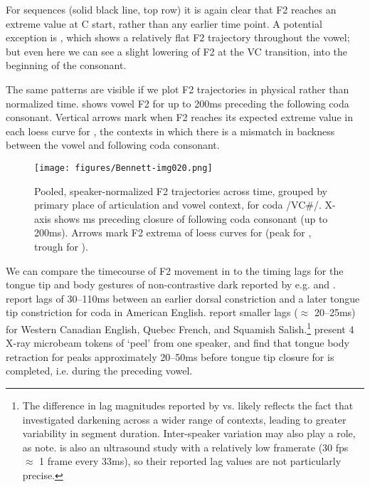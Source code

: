 \documentclass[output=paper,colorlinks,citecolor=brown]{langscibook}
\newcommand{\vel}{\ipa{ˠ}}
\begin{document}
For \ipa{/iːC\vel/} sequences (solid black line, top row) it is again clear that F2 reaches an extreme value at C start, rather than any earlier time point. A potential exception is \ipa{/iːk\vel/}, which shows a relatively flat F2 trajectory throughout the vowel; but even here we can see a slight lowering of F2 at the VC transition, into the beginning of the consonant.

The same patterns are visible if we plot F2 trajectories in physical rather than normalized time.  shows vowel F2 for up to 200ms preceding the following coda consonant. Vertical arrows mark when F2 reaches its expected extreme value in each loess curve for , the contexts in which there is a mismatch in backness between the vowel and following coda consonant.

\begin{figure}
    \centering
    \texttt{[image: figures/Bennett-img020.png]}
    \caption{Pooled, speaker-normalized F2 trajectories across time, grouped by primary place of articulation and vowel context, for coda /VC\#/. X-axis shows ms preceding closure of following coda consonant (up to 200ms). Arrows mark F2 extrema of loess curves for  (peak for , trough for ).}
    \label{fig:lognormf2-ms}
\end{figure}

We can compare the timecourse of F2 movement in  to the timing lags for the tongue tip and body gestures of non-contrastive dark \ipa{[ɫ]} reported by e.g. \citet{Sproat_Fujimura1993_l-allophony} and \citet{Gick_etal:2006_liquids}. \citet[299, 303]{Sproat_Fujimura1993_l-allophony} report lags of 30--110ms between an earlier dorsal constriction and a later tongue tip constriction for coda \ipa{[ɫ]} in American English. \citet[Table 2]{Gick_etal:2006_liquids} report smaller lags ($\approx$ 20--25ms) for Western Canadian English, Quebec French, and Squamish Salish.\footnote{The difference in lag magnitudes reported by \citet{Sproat_Fujimura1993_l-allophony} vs. \citet{Gick_etal:2006_liquids} likely reflects the fact that \citeauthor{Sproat_Fujimura1993_l-allophony} investigated  darkening across a wider range of contexts, leading to greater variability in segment duration. Inter-speaker variation may also play a role, as \citet[65]{Gick_etal:2006_liquids} note. \citet{Gick_etal:2006_liquids} is also an ultrasound study with a relatively low framerate (30 fps $\approx$ 1 frame every 33ms), so their reported lag values are not particularly precise.} \citet{Browman_Goldstein1995_gestural_syll_position} present 4 X-ray microbeam tokens of `peel' \ipa{[pʰiɫ]} from one speaker, and find that tongue body retraction for \ipa{[ɫ]} peaks approximately 20--50ms before tongue tip closure for \ipa{[ɫ]} is completed, i.e. during the preceding vowel.
\end{document}
